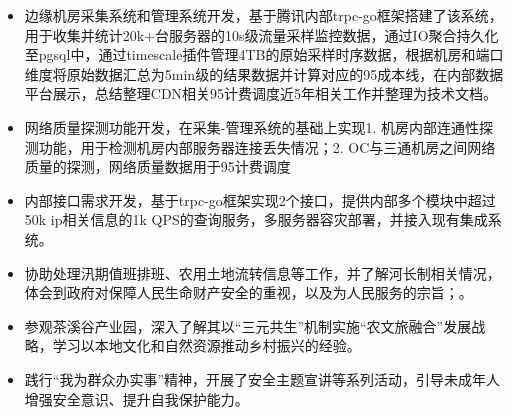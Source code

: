 \documentclass{resume} %
\begin{document}
\begin{itemize}[parsep=0.5ex]
  \item 边缘机房采集系统和管理系统开发，基于腾讯内部trpc-go框架搭建了该系统，用于收集并统计20k+台服务器的10s级流量采样监控数据，通过IO聚合持久化至pgsql中，通过timescale插件管理4TB的原始采样时序数据，根据机房和端口维度将原始数据汇总为5min级的结果数据并计算对应的95成本线，在内部数据平台展示，总结整理CDN相关95计费调度近5年相关工作并整理为技术文档。
  \item 网络质量探测功能开发，在采集-管理系统的基础上实现1. 机房内部连通性探测功能，用于检测机房内部服务器连接丢失情况；2. OC与三通机房之间网络质量的探测，网络质量数据用于95计费调度
  \item 内部接口需求开发，基于trpc-go框架实现2个接口，提供内部多个模块中超过50k ip相关信息的1k QPS的查询服务，多服务器容灾部署，并接入现有集成系统。
\end{itemize}

\begin{itemize}[parsep=0.5ex]
  \item 协助处理汛期值班排班、农用土地流转信息等工作，并了解河长制相关情况，体会到政府对保障人民生命财产安全的重视，以及为人民服务的宗旨；。
  \item 参观茶溪谷产业园，深入了解其以“三元共生”机制实施“农文旅融合”发展战略，学习以本地文化和自然资源推动乡村振兴的经验。
  \item 践行“我为群众办实事”精神，开展了安全主题宣讲等系列活动，引导未成年人增强安全意识、提升自我保护能力。
\end{itemize}
\end{document}
